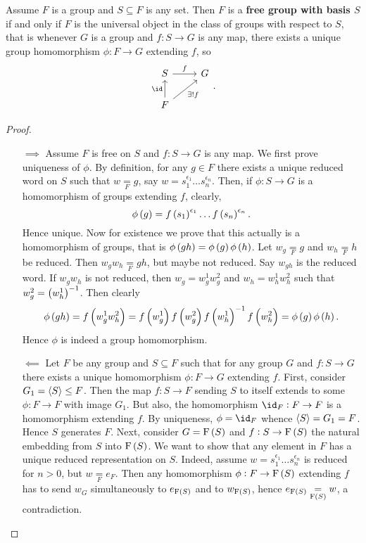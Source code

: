\begin{proposition}
\label{prop:1.4.6}
Assume $ F $ is a group and $ S \subseteq F $ is any set. Then $ F $ is a \textbf{free group with basis $ S $} if and only if $ F $ is the universal object in the class of groups with respect to $ S $, that is whenever $ G $ is a group and $ f : S \to G $ is any map, there exists a unique group homomorphism $ \phi : F \to G $ extending $ f $, so
$$
\begin{tikzcd}
S \arrow{r}{f} & G \\
F \arrow{u}{\id} \arrow[swap]{ur}{\exists !f} &
\end{tikzcd}.
$$
\end{proposition}

\begin{proof}
\hfill
\begin{itemize}
\item[$ \implies $] Assume $ F $ is free on $ S $ and $ f : S \to G $ is any map. We first prove uniqueness of $ \phi $. By definition, for any $ g \in F $ there exists a unique reduced word on $ S $ such that $ w \underset{F}{=} g $, say $ w = s_1^{\epsilon_1} \dots s_n^{\epsilon_n} $. Then, if $ \phi : S \to G $ is a homomorphism of groups extending $ f $, clearly,
$$ \phi\br{g} = f\br{s_1}^{\epsilon_1} \dots f\br{s_n}^{\epsilon_n}. $$
Hence unique. Now for existence we prove that this actually is a homomorphism of groups, that is $ \phi\br{gh} = \phi\br{g}\phi\br{h} $. Let $ w_g \underset{F}{=} g $ and $ w_h \underset{F}{=} h $ be reduced. Then $ w_gw_h \underset{F}{=} gh $, but maybe not reduced. Say $ w_{gh} $ is the reduced word. If $ w_gw_h $ is not reduced, then $ w_g = w_g^1w_g^2 $ and $ w_h = w_h^1w_h^2 $ such that $ w_g^2 = \br{w_h^1}^{-1} $. Then clearly
$$ \phi\br{gh} = f\br{w_g^1w_h^2} = f\br{w_g^1}f\br{w_g^2}f\br{w_h^1}^{-1}f\br{w_h^2} = \phi\br{g}\phi\br{h}. $$
Hence $ \phi $ is indeed a group homomorphism.

\pagebreak

\item[$ \impliedby $] Let $ F $ be any group and $ S \subseteq F $ such that for any group $ G $ and $ f : S \to G $ there exists a unique homomorphism $ \phi : F \to G $ extending $ f $. First, consider $ G_1 = \left\langle S \right\rangle \le F $. Then the map $ f : S \to F $ sending $ S $ to itself extends to some $ \phi : F \to F $ with image $ G_1 $. But also, the homomorphism $ \id_F : F \to F $ is a homomorphism extending $ f $. By uniqueness, $ \phi = \id_F $ whence $ \left\langle S \right\rangle = G_1 = F $. Hence $ S $ generates $ F $. Next, consider $ G = \F\br{S} $ and $ f : S \to \F\br{S} $ the natural embedding from $ S $ into $ \F\br{S} $. We want to show that any element in $ F $ has a unique reduced representation on $ S $. Indeed, assume $ w = s_1^{\epsilon_1} \dots s_n^{\epsilon_n} $ is reduced for $ n > 0 $, but $ w \underset{F}{=} e_F $. Then any homomorphism $ \phi : F \to \F\br{S} $ extending $ f $ has to send $ w_G $ simultaneously to $ e_{\F\br{S}} $ and to $ w_{\F\br{S}} $, hence $ e_{\F\br{S}} \underset{\F\br{S}}{=} w $, a contradiction.
\end{itemize}
\end{proof}

